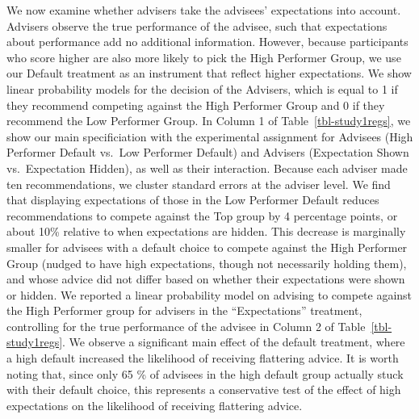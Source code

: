 \documentclass[
  man,
  floatsintext,
  longtable,
  nolmodern,
  notxfonts,
  notimes,
  colorlinks=true,linkcolor=blue,citecolor=blue,urlcolor=blue]{apa7}
\begin{document}
We now examine whether advisers take the advisees' expectations into
account. Advisers observe the true performance of the advisee, such that
expectations about performance add no additional information. However,
because participants who score higher are also more likely to pick the
High Performer Group, we use our Default treatment as an instrument that
reflect higher expectations. We show linear probability models for the
decision of the Advisers, which is equal to 1 if they recommend
competing against the High Performer Group and 0 if they recommend the
Low Performer Group. In Column 1 of Table~\ref{tbl-study1regs}, we show
our main specificiation with the experimental assignment for Advisees
(High Performer Default vs.~Low Performer Default) and Advisers
(Expectation Shown vs.~Expectation Hidden), as well as their
interaction. Because each adviser made ten recommendations, we cluster
standard errors at the adviser level. We find that displaying
expectations of those in the Low Performer Default reduces
recommendations to compete against the Top group by 4 percentage points,
or about 10\% relative to when expectations are hidden. This decrease is
marginally smaller for advisees with a default choice to compete against
the High Performer Group (nudged to have high expectations, though not
necessarily holding them), and whose advice did not differ based on
whether their expectations were shown or hidden. We reported a linear
probability model on advising to compete against the High Performer
group for advisers in the ``Expectations'' treatment, controlling for
the true performance of the advisee in Column 2 of
Table~\ref{tbl-study1regs}. We observe a significant main effect of the
default treatment, where a high default increased the likelihood of
receiving flattering advice. It is worth noting that, since only 65 \%
of advisees in the high default group actually stuck with their default
choice, this represents a conservative test of the effect of high
expectations on the likelihood of receiving flattering advice.
\end{document}
